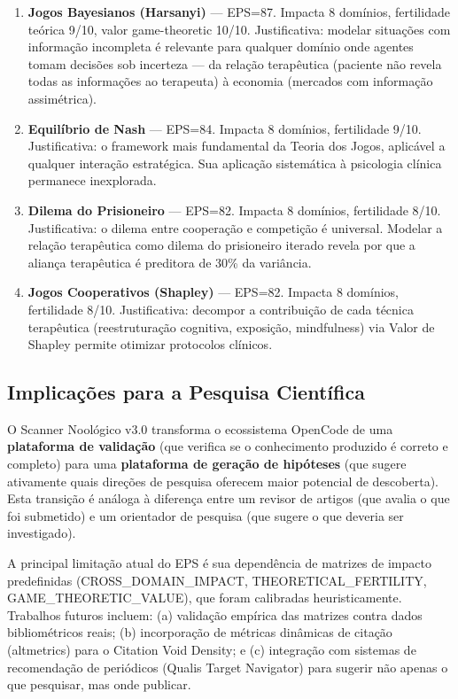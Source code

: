 \documentclass[12pt,a4paper]{article}
\begin{document}
\begin{enumerate}[itemsep=1pt]
  \item \textbf{Jogos Bayesianos (Harsanyi)} --- EPS=87. Impacta 8 domínios, fertilidade teórica 9/10, valor game-theoretic 10/10. Justificativa: modelar situações com informação incompleta é relevante para qualquer domínio onde agentes tomam decisões sob incerteza --- da relação terapêutica (paciente não revela todas as informações ao terapeuta) à economia (mercados com informação assimétrica).
  \item \textbf{Equilíbrio de Nash} --- EPS=84. Impacta 8 domínios, fertilidade 9/10. Justificativa: o framework mais fundamental da Teoria dos Jogos, aplicável a qualquer interação estratégica. Sua aplicação sistemática à psicologia clínica permanece inexplorada.
  \item \textbf{Dilema do Prisioneiro} --- EPS=82. Impacta 8 domínios, fertilidade 8/10. Justificativa: o dilema entre cooperação e competição é universal. Modelar a relação terapêutica como dilema do prisioneiro iterado revela por que a aliança terapêutica é preditora de 30\% da variância.
  \item \textbf{Jogos Cooperativos (Shapley)} --- EPS=82. Impacta 8 domínios, fertilidade 8/10. Justificativa: decompor a contribuição de cada técnica terapêutica (reestruturação cognitiva, exposição, mindfulness) via Valor de Shapley permite otimizar protocolos clínicos.
\end{enumerate}

\subsection{Implicações para a Pesquisa Científica}

O Scanner Noológico v3.0 transforma o ecossistema OpenCode de uma \textbf{plataforma de validação} (que verifica se o conhecimento produzido é correto e completo) para uma \textbf{plataforma de geração de hipóteses} (que sugere ativamente quais direções de pesquisa oferecem maior potencial de descoberta). Esta transição é análoga à diferença entre um revisor de artigos (que avalia o que foi submetido) e um orientador de pesquisa (que sugere o que deveria ser investigado).

A principal limitação atual do EPS é sua dependência de matrizes de impacto predefinidas (CROSS\_DOMAIN\_IMPACT, THEORETICAL\_FERTILITY, GAME\_THEORETIC\_VALUE), que foram calibradas heuristicamente. Trabalhos futuros incluem: (a) validação empírica das matrizes contra dados bibliométricos reais; (b) incorporação de métricas dinâmicas de citação (altmetrics) para o Citation Void Density; e (c) integração com sistemas de recomendação de periódicos (Qualis Target Navigator) para sugerir não apenas o que pesquisar, mas onde publicar.
\end{document}
